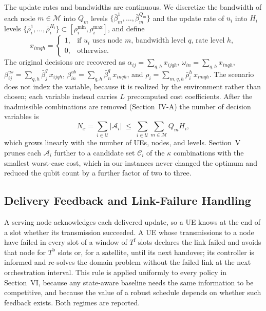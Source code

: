 The update rates and bandwidths are continuous. We discretize the bandwidth of each node $m\in\mathscr{M}$ into $Q_m$
levels $\{\bar\beta_m^1,\ldots,\bar\beta_m^{Q_m}\}$ and the update rate of $u_i$ into $H_i$ levels
$\{\bar\rho_i^1,\ldots,\bar\rho_i^{H_i}\}\subset[\rho_i^{\min},\rho_i^{\max}]$, and define
\begin{equation}
    x_{imqh}=
    \begin{cases}
        1, & \text{if } u_i \text{ uses node } m\text{, bandwidth level } q\text{, rate level } h, \\
        0, & \text{otherwise}.
    \end{cases}
    \label{eq:x_def}
\end{equation}
The original decisions are recovered as $\alpha_{ij}=\sum_{q,h}x_{ijqh}$, $\omega_{in}=\sum_{q,h}x_{inqh}$,
$\beta^{us}_{ij}=\sum_{q,h}\bar\beta_j^q\,x_{ijqh}$, $\beta^{ub}_{in}=\sum_{q,h}\bar\beta_n^q\,x_{inqh}$, and
$\rho_i=\sum_{m,q,h}\bar\rho_i^h\,x_{imqh}$. The scenario does not index the variable, because it is realized by the
environment rather than chosen; each variable instead carries $L$ precomputed cost coefficients. After the
inadmissible combinations are removed (Section~IV-A) the number of decision variables is
\begin{equation}
    N_{x}=\sum_{i\in\mathscr{U}}|\mathscr{A}_i|\;\leq\;\sum_{i\in\mathscr{U}}\sum_{m\in\mathscr{M}}Q_{m}H_{i},
    \label{eq:Nx}
\end{equation}
which grows linearly with the number of UEs, nodes, and levels. Section~V prunes each $\mathscr{A}_i$ further to a
candidate set $\mathscr{C}_i$ of the $\kappa$ combinations with the smallest worst-case cost, which in our instances
never changed the optimum and reduced the qubit count by a further factor of two to three.

\subsection{Delivery Feedback and Link-Failure Handling}

A serving node acknowledges each delivered update, so a UE knows at the end of a slot whether its transmission
succeeded. A UE whose transmissions to a node have failed in every slot of a window of $T^{\mathrm{f}}$ slots declares
the link failed and avoids that node for $T^{\mathrm{b}}$ slots or, for a satellite, until its next handover; its
controller is informed and re-solves the domain problem without the failed link at the next orchestration interval.
This rule is applied uniformly to every policy in Section~VI, because any state-aware baseline needs the same
information to be competitive, and because the value of a robust schedule depends on whether such feedback exists.
Both regimes are reported.

